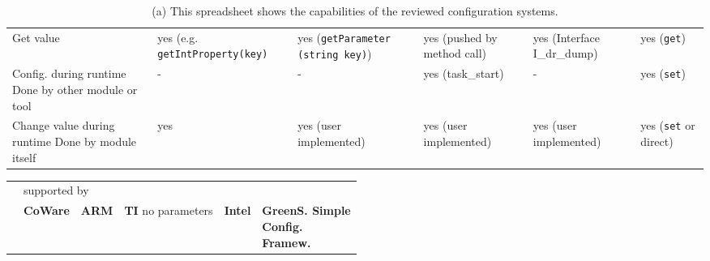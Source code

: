 \begin{landscape}
\begin{table}[H]
\begin{tabularx}{23cm}{|X|X|X|X|X|X|}
		Get value   & yes (e.g. \lstinline|getIntProperty(key)|   & yes (\lstinline|getParameter| \newline \lstinline|(string key)|)   & yes (pushed by method call)   & yes (Interface I\_dr\_dump)   & yes (\lstinline|get|)  \\ 
		\cline{1-1}\cline{2-2}\cline{3-3}\cline{4-4}\cline{5-5}\cline{6-6}
		Config. during runtime \newline Done by other module or tool   & -   & -   & yes (task\_start)   & -   & yes (\lstinline|set|)  \\ 
		\cline{1-1}\cline{2-2}\cline{3-3}\cline{4-4}\cline{5-5}\cline{6-6}
		Change value during runtime \newline Done by module itself   & yes   & yes (user implemented)   & yes (user implemented)   & yes (user implemented)   & yes (\lstinline|set| or direct)  \\ 
		\cline{1-1}\cline{2-2}\cline{3-3}\cline{4-4}\cline{5-5}\cline{6-6}
	\end{tabularx}
	\caption{(a) This spreadsheet shows the capabilities of the reviewed configuration systems.}
	\label{tbl:capabilitiesa}
\end{table}

\begin{table}[H]
	\begin{tabularx}{23cm}{|X|X|X|X|X|X|}
		\cline{1-1}\cline{2-2}\cline{3-3}\cline{4-4}\cline{5-5}\cline{6-6}
		               & \multicolumn{5}{|l|}{ supported by    }\\ 
		\cline{1-1}\cline{2-2}\cline{3-3}\cline{4-4}\cline{5-5}\cline{6-6}
		               & {\bf Co\lstinline||Ware}   & {\bf ARM}   & {\bf TI} \newline no parameters   & {\bf Intel}   & {\bf GreenS. Simple \newline Config. \newline  Framew.}  \\ 
	

\end{tabularx}
\end{table}
\end{landscape}
